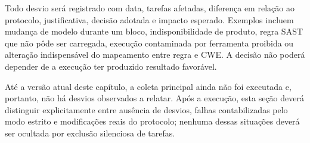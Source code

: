 Todo desvio será registrado com data, tarefas afetadas, diferença em relação ao protocolo, justificativa, decisão adotada e impacto esperado. Exemplos incluem mudança de modelo durante um bloco, indisponibilidade de produto, regra SAST que não pôde ser carregada, execução contaminada por ferramenta proibida ou alteração indispensável do mapeamento entre regra e CWE. A decisão não poderá depender de a execução ter produzido resultado favorável.

Até a versão atual deste capítulo, a coleta principal ainda não foi executada e, portanto, não há desvios observados a relatar. Após a execução, esta seção deverá distinguir explicitamente entre ausência de desvios, falhas contabilizadas pelo modo estrito e modificações reais do protocolo; nenhuma dessas situações deverá ser ocultada por exclusão silenciosa de tarefas.
